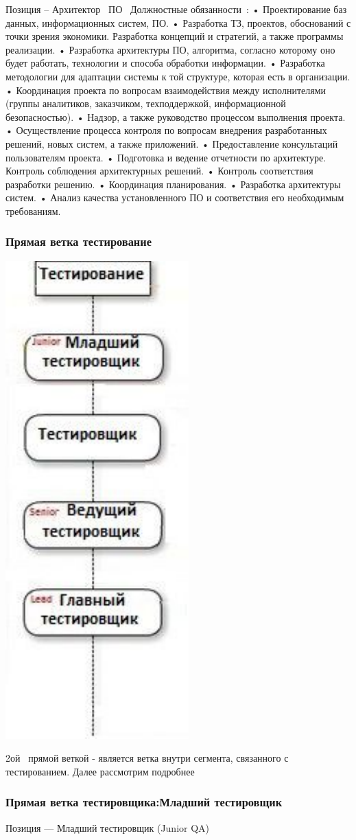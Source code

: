 \documentclass{../industrial-development}
\begin{document}
{\lecturenotes
Позиция – Архитектор~\cite{hh} ПО~\cite{itcf}
Должностные обязанности~\cite{rab}: 
•	Проектирование баз данных, информационных систем, ПО. 
•	Разработка ТЗ, проектов, обоснований с точки зрения экономики. Разработка концепций и стратегий, а также программы реализации. 
•	Разработка архитектуры ПО, алгоритма, согласно которому оно будет работать, технологии и способа обработки информации. 
•	Разработка методологии для адаптации системы к той структуре, которая есть в организации. 
•	Координация проекта по вопросам взаимодействия между исполнителями (группы аналитиков, заказчиком, техподдержкой, информационной безопасностью). 
•	Надзор, а также руководство процессом выполнения проекта. 
•	Осуществление процесса контроля по вопросам внедрения разработанных решений, новых систем, а также приложений. 
•	Предоставление консультаций пользователям проекта. 
•	Подготовка и ведение отчетности по архитектуре. Контроль соблюдения архитектурных решений.
•	 Контроль соответствия разработки решению. 
•	Координация планирования.
•	 Разработка архитектуры систем. 
•	Анализ качества установленного ПО и соответствия его необходимым требованиям. 


\begin{frame} \frametitle{Прямая ветка тестирование }
  \centerline{\includegraphics[width=0.27\linewidth]{11-IT-specialist's-way/sch11b.pdf}}
\end{frame}
\lecturenotes
 2ой~\cite{mc} прямой веткой  - является ветка внутри сегмента, связанного с тестированием. Далее рассмотрим подробнее


\begin{frame} \frametitle{Прямая ветка тестировщика:Младший тестировщик}
 \begin{block}{}
  \alert{Позиция --- Младший тестировщик (Junior QA)}


\end{block}
\end{frame}}
\end{document}

